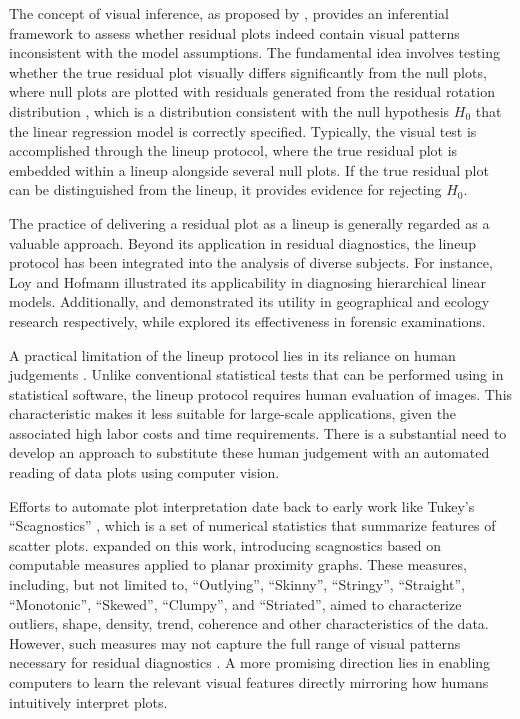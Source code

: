 \documentclass[]{interact}
\theoremstyle{plain}%
\theoremstyle{definition}
\theoremstyle{remark}
\begin{document}
The concept of visual inference, as proposed by
\citet{buja2009statistical}, provides an inferential framework to assess
whether residual plots indeed contain visual patterns inconsistent with
the model assumptions. The fundamental idea involves testing whether the
true residual plot visually differs significantly from the null plots,
where null plots are plotted with residuals generated from the residual
rotation distribution \citep{langsrud2005rotation}, which is a
distribution consistent with the null hypothesis \(H_0\) that the linear
regression model is correctly specified. Typically, the visual test is
accomplished through the lineup protocol, where the true residual plot
is embedded within a lineup alongside several null plots. If the true
residual plot can be distinguished from the lineup, it provides evidence
for rejecting \(H_0\).

The practice of delivering a residual plot as a lineup is generally
regarded as a valuable approach. Beyond its application in residual
diagnostics, the lineup protocol has been integrated into the analysis
of diverse subjects. For instance, Loy and Hofmann
\citetext{\citeyear{loy2013diagnostic}; \citeyear{loy2014hlmdiag}; \citeyear{loy2015you}}
illustrated its applicability in diagnosing hierarchical linear models.
Additionally, \citet{widen2016graphical} and \citet{fieberg2024using}
demonstrated its utility in geographical and ecology research
respectively, while \citet{krishnan2021hierarchical} explored its
effectiveness in forensic examinations.

A practical limitation of the lineup protocol lies in its reliance on
human judgements \citep[see][]{li2024plot}. Unlike conventional
statistical tests that can be performed using in statistical software,
the lineup protocol requires human evaluation of images. This
characteristic makes it less suitable for large-scale applications,
given the associated high labor costs and time requirements. There is a
substantial need to develop an approach to substitute these human
judgement with an automated reading of data plots using computer vision.

Efforts to automate plot interpretation date back to early work like
Tukey's ``Scagnostics'' \citep{tukey1985computer}, which is a set of
numerical statistics that summarize features of scatter plots.
\citet{wilkinson2005graph} expanded on this work, introducing
scagnostics based on computable measures applied to planar proximity
graphs. These measures, including, but not limited to, ``Outlying'',
``Skinny'', ``Stringy'', ``Straight'', ``Monotonic'', ``Skewed'',
``Clumpy'', and ``Striated'', aimed to characterize outliers, shape,
density, trend, coherence and other characteristics of the data.
However, such measures may not capture the full range of visual patterns
necessary for residual diagnostics \citep{buja2009statistical}. A more
promising direction lies in enabling computers to learn the relevant
visual features directly mirroring how humans intuitively interpret
plots.
\end{document}
